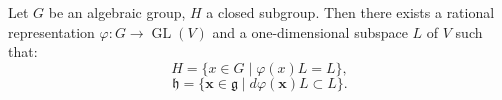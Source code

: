 Let $G$ be an algebraic group, $H$ a closed subgroup. Then there exists a rational representation $\varphi: G \rightarrow \operatorname{GL}(V)$ and a one-dimensional subspace $L$ of $V$ such that:
$$H = \{x \in G \mid \varphi(x) L = L\},$$
$$\mathfrak{h} = \{\mathbf{x} \in \mathfrak{g} \mid d\varphi(\mathbf{x}) L \subset L\}.$$
